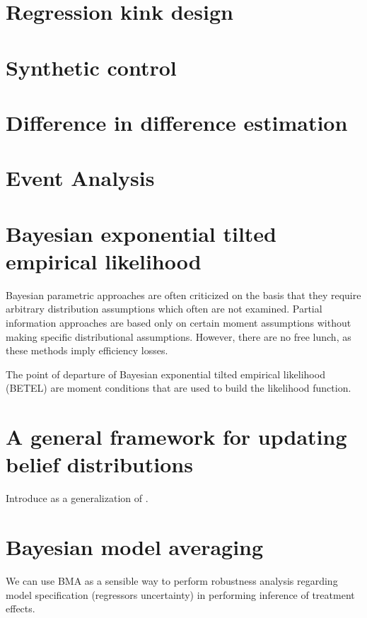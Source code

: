 \section{Regression kink design}\label{sec12_4}
\cite{chan2025minimum}

\section{Synthetic control}\label{sec12_5}
\cite{amjad2018robust,kim2020bayesian}

\section{Difference in difference estimation}\label{sec12_6}
\cite{normington2019bayesian,normington2022bayesian,breunig2024semiparametric}

\section{Event Analysis}\label{sec12_7}

\section{Bayesian exponential tilted empirical likelihood}\label{sec12_8}
Bayesian parametric approaches are often criticized on the basis that they require arbitrary distribution assumptions which often are not examined. Partial information approaches are based only on certain moment assumptions without making specific distributional assumptions. However, there are no free lunch, as these methods imply efficiency losses.

The point of departure of Bayesian exponential tilted empirical likelihood (BETEL) are moment conditions that are used to build the likelihood function.

\section{A general framework for updating belief distributions}\label{sec12_9}
Introduce \cite{bissiri2016general} as a generalization of \cite{chernozhukov2003mcmc}.

\section{Bayesian model averaging}\label{sec12_10}
We can use BMA as a sensible way to perform robustness analysis regarding model specification (regressors uncertainty) in performing inference of treatment effects.

